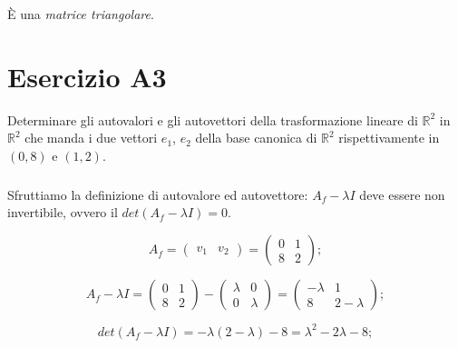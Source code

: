 \documentclass[a4paper]{report}
\newenvironment{problem}
        {
                \begin{mdframed}[topline=false,rightline=false,bottomline=false]
                        \slshape
        }
        {
                \end{mdframed}
        }
\begin{document}
        \`{E} una \emph{matrice triangolare}.


        \chapter*{Esercizio A3}
        \begin{problem}
                Determinare gli autovalori e gli autovettori della trasformazione lineare
                di $\mathbb{R}^2$ in $\mathbb{R}^2$ che manda i due vettori $e_1$, $e_2$
                della base canonica di $\mathbb{R}^2$ rispettivamente in $(0, 8)$ e $(1, 2)$.
        \end{problem}

        \paragraph{}
        Sfruttiamo la definizione di autovalore ed autovettore:
        $A_{f} - \lambda I$ deve essere non invertibile,
        ovvero il $det(A_{f} - \lambda I) = 0$.

        \[
                A_{f} = \begin{pmatrix}
                        v_1 & v_2
                \end{pmatrix} = \begin{pmatrix}
                        0 & 1 \\
                        8 & 2
                \end{pmatrix};
        \]

        \[
                A_{f} -\lambda I = \begin{pmatrix}
                        0 & 1 \\
                        8 & 2
                \end{pmatrix} - \begin{pmatrix}
                        \lambda & 0 \\
                        0       & \lambda
                \end{pmatrix} = \begin{pmatrix}
                        -\lambda & 1 \\
                        8        & 2 - \lambda
                \end{pmatrix};
        \]

        \[
                det(A_{f} - \lambda I) = - \lambda (2 - \lambda) - 8 = \lambda^{2} - 2 \lambda - 8;
        \]
\end{document}
